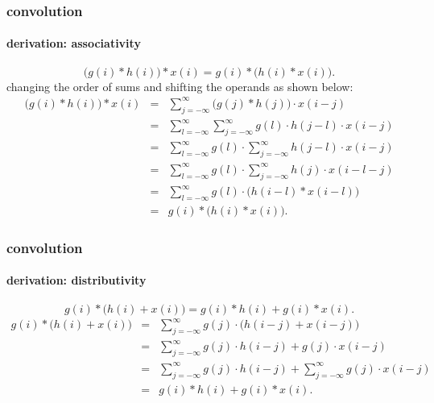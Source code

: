 \begin{frame}\frametitle{convolution}\framesubtitle{derivation: associativity}
\vspace{-8mm}
\begin{footnotesize}
		\begin{equation}
			\big(g(i) \ast h(i)\big) \ast x(i) = g(i) \ast \big(h(i) \ast x(i)\big).
		\end{equation}
		changing the order of sums and shifting the operands as shown below:
		\begin{eqnarray}
			\big(g(i) \ast h(i)\big) \ast x(i)	&=& \sum\limits_{j=-\infty}^{\infty}{\big(g(j) \ast h(j)\big)\cdot x(i-j)}\nonumber\\
												&=& \sum\limits_{l=-\infty}^{\infty}{\sum\limits_{j=-\infty}^{\infty}{g(l)\cdot h(j-l)}\cdot x(i-j)}\nonumber\\
												&=& \sum\limits_{l=-\infty}^{\infty}{g(l)\cdot \sum\limits_{j=-\infty}^{\infty}{h(j-l)}\cdot x(i-j)}\nonumber\\
												&=& \sum\limits_{l=-\infty}^{\infty}{g(l)\cdot \sum\limits_{j=-\infty}^{\infty}{h(j)}\cdot x(i-l-j)}\nonumber\\
												&=& \sum\limits_{l=-\infty}^{\infty}{g(l)\cdot  \big(h(i-l) \ast x(i-l)\big)}\nonumber\\
												&=& g(i) \ast \big(h(i) \ast x(i)\big) .
		\end{eqnarray}
\end{footnotesize}
\end{frame}	

\begin{frame}\frametitle{convolution}\framesubtitle{derivation: distributivity}
\begin{footnotesize}
		\begin{equation}
			g(i) \ast \big(h(i) + x(i)\big) = g(i) \ast h(i) + g(i) \ast x(i) .
		\end{equation}
		\begin{eqnarray}
			g(i) \ast \big(h(i) + x(i)\big) &=& \sum\limits_{j=-\infty}^{\infty}{g(j) \cdot\big(h(i-j) + x(i-j)\big)}\nonumber\\
									&=& \sum\limits_{j=-\infty}^{\infty}{g(j) \cdot h(i-j) + g(j) \cdot x(i-j)}\nonumber\\
									&=& \sum\limits_{j=-\infty}^{\infty}{g(j) \cdot h(i-j)} + \sum\limits_{j=-\infty}^{\infty}{g(j) \cdot x(i-j)}\nonumber\\
									&=& g(i) \ast h(i) + g(i) \ast x(i) .
		\end{eqnarray}
\end{footnotesize}
\end{frame}	
